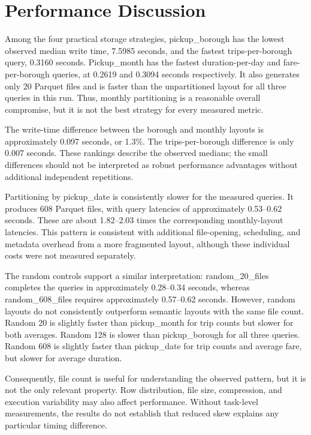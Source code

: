 \documentclass[a4paper,11pt]{article}
\begin{document}
\section{Performance Discussion}

Among the four practical storage strategies, pickup\_borough has the lowest observed median write time, 7.5985 seconds, and the fastest trips-per-borough query, 0.3160 seconds. Pickup\_month has the fastest duration-per-day and fare-per-borough queries, at 0.2619 and 0.3094 seconds respectively. It also generates only 20 Parquet files and is faster than the unpartitioned layout for all three queries in this run. Thus, monthly partitioning is a reasonable overall compromise, but it is not the best strategy for every measured metric.

The write-time difference between the borough and monthly layouts is approximately 0.097 seconds, or 1.3\%. The trips-per-borough difference is only 0.007 seconds. These rankings describe the observed medians; the small differences should not be interpreted as robust performance advantages without additional independent repetitions.

Partitioning by pickup\_date is consistently slower for the measured queries. It produces 608 Parquet files, with query latencies of approximately 0.53--0.62 seconds. These are about 1.82--2.03 times the corresponding monthly-layout latencies. This pattern is consistent with additional file-opening, scheduling, and metadata overhead from a more fragmented layout, although these individual costs were not measured separately.

The random controls support a similar interpretation: random\_20\_files completes the queries in approximately 0.28--0.34 seconds, whereas random\_608\_files requires approximately 0.57--0.62 seconds. However, random layouts do not consistently outperform semantic layouts with the same file count. Random 20 is slightly faster than pickup\_month for trip counts but slower for both averages. Random 128 is slower than pickup\_borough for all three queries. Random 608 is slightly faster than pickup\_date for trip counts and average fare, but slower for average duration.

Consequently, file count is useful for understanding the observed pattern, but it is not the only relevant property. Row distribution, file size, compression, and execution variability may also affect performance. Without task-level measurements, the results do not establish that reduced skew explains any particular timing difference.
\end{document}
